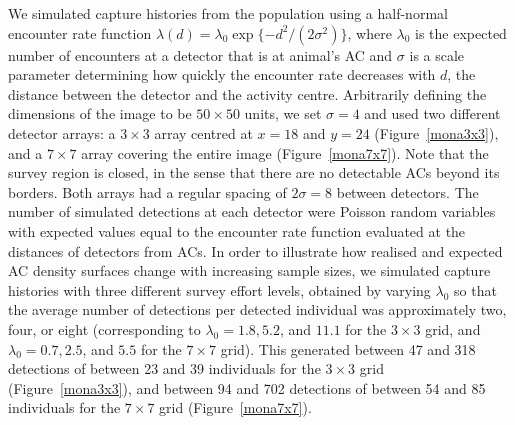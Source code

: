 \documentclass[useAMS,usenatbib,referee]{biom}
\begin{document}
We simulated capture histories from the population using a half-normal encounter rate function $\lambda(d) = \lambda_0\exp\{-d^2/(2\sigma^2)\}$, where $\lambda_0$ is the expected number of encounters at a detector that is at animal's AC and $\sigma$ is a scale parameter determining how quickly the encounter rate decreases with $d$, the distance between the detector and the activity centre. Arbitrarily defining the dimensions of the image to be $50\times 50$ units, we set $\sigma=4$ and used two different detector arrays: a $3\times3$ array centred at $x=18$ and $y=24$ (Figure~\ref{mona3x3}), and a $7\times 7$ array covering the entire image (Figure~\ref{mona7x7}). Note that the survey region is closed, in the sense that there are no detectable ACs beyond its borders. Both arrays had a regular spacing of $2\sigma=8$ between detectors. The number of simulated detections at each detector were Poisson random variables with expected values equal to the encounter rate function evaluated at the distances of detectors from ACs. In order to illustrate how realised and expected AC density surfaces change with increasing sample sizes, we simulated capture histories with three different survey effort levels, obtained by varying $\lambda_0$ so that the average number of detections per detected individual was approximately two, four, or eight (corresponding to $\lambda_0=1.8, 5.2$, and $11.1$ for the $3\times 3$ grid, and $\lambda_0=0.7, 2.5$, and $5.5$ for the $7\times 7$ grid). This generated between 47 and 318 detections of between 23 and 39 individuals for the $3\times 3$ grid (Figure~\ref{mona3x3}), and between 94 and 702 detections of between 54 and 85 individuals for the $7\times 7$ grid (Figure~\ref{mona7x7}).
\end{document}
